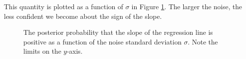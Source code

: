 \documentclass{article}
\begin{document}
This quantity is plotted as a function of $\sigma$ in Figure
\ref{problem_4}.  The larger the noise, the less confident we become
about the sign of the slope.

\begin{figure}
  \centering
  
  \caption{The posterior probability that the slope of the regression
    line is positive as a function of the noise standard deviation
    $\sigma$.  Note the limits on the $y$-axis.}
  \label{problem_4}
\end{figure}
\end{document}
